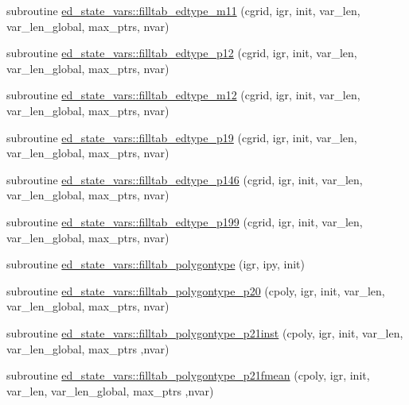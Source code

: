 \begin{DoxyCompactItemize}
\item 
subroutine \hyperlink{namespaceed__state__vars_ab9eaf06f12f8739d511341e99dad51eb}{ed\+\_\+state\+\_\+vars\+::filltab\+\_\+edtype\+\_\+m11} (cgrid, igr, init, var\+\_\+len, var\+\_\+len\+\_\+global, max\+\_\+ptrs, nvar)
\item 
subroutine \hyperlink{namespaceed__state__vars_a78f2d3db9b379cbde2178f6366ebdd06}{ed\+\_\+state\+\_\+vars\+::filltab\+\_\+edtype\+\_\+p12} (cgrid, igr, init, var\+\_\+len, var\+\_\+len\+\_\+global, max\+\_\+ptrs, nvar)
\item 
subroutine \hyperlink{namespaceed__state__vars_a4834dc1fa685230019880cc6c9cf4ed0}{ed\+\_\+state\+\_\+vars\+::filltab\+\_\+edtype\+\_\+m12} (cgrid, igr, init, var\+\_\+len, var\+\_\+len\+\_\+global, max\+\_\+ptrs, nvar)
\item 
subroutine \hyperlink{namespaceed__state__vars_a6265fcb655ce420fb53d9d9a70a676c7}{ed\+\_\+state\+\_\+vars\+::filltab\+\_\+edtype\+\_\+p19} (cgrid, igr, init, var\+\_\+len, var\+\_\+len\+\_\+global, max\+\_\+ptrs, nvar)
\item 
subroutine \hyperlink{namespaceed__state__vars_a973191c14021cf533e4643205c6623d8}{ed\+\_\+state\+\_\+vars\+::filltab\+\_\+edtype\+\_\+p146} (cgrid, igr, init, var\+\_\+len, var\+\_\+len\+\_\+global, max\+\_\+ptrs, nvar)
\item 
subroutine \hyperlink{namespaceed__state__vars_a241cb06b937cbad37050f035e6305788}{ed\+\_\+state\+\_\+vars\+::filltab\+\_\+edtype\+\_\+p199} (cgrid, igr, init, var\+\_\+len, var\+\_\+len\+\_\+global, max\+\_\+ptrs, nvar)
\item 
subroutine \hyperlink{namespaceed__state__vars_a5059d40682c2653017de524077b8dae5}{ed\+\_\+state\+\_\+vars\+::filltab\+\_\+polygontype} (igr, ipy, init)
\item 
subroutine \hyperlink{namespaceed__state__vars_a246e5298a265c587bd0f78db320e29c5}{ed\+\_\+state\+\_\+vars\+::filltab\+\_\+polygontype\+\_\+p20} (cpoly, igr, init, var\+\_\+len, var\+\_\+len\+\_\+global, max\+\_\+ptrs, nvar)
\item 
subroutine \hyperlink{namespaceed__state__vars_a64d47c7d852aa23bca56c7de34683c9d}{ed\+\_\+state\+\_\+vars\+::filltab\+\_\+polygontype\+\_\+p21inst} (cpoly, igr, init, var\+\_\+len, var\+\_\+len\+\_\+global, max\+\_\+ptrs                                                                                                                                                                       ,nvar)
\item 
subroutine \hyperlink{namespaceed__state__vars_af19ecf7678627fccba6adcca82feb553}{ed\+\_\+state\+\_\+vars\+::filltab\+\_\+polygontype\+\_\+p21fmean} (cpoly, igr, init, var\+\_\+len, var\+\_\+len\+\_\+global, max\+\_\+ptrs                                                                                                                                                                   ,nvar)

\end{DoxyCompactItemize}
